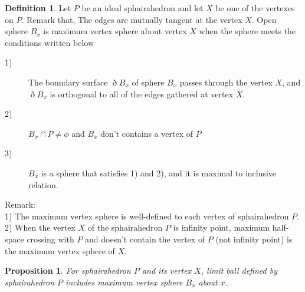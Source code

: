 \documentclass[suppldata, dvipdfmx]{interact}
\theoremstyle{plain}%
\newtheorem{proposition}[theorem]{Proposition}
\theoremstyle{definition}
\newtheorem{definition}[theorem]{Definition}
\theoremstyle{remark}
\theoremstyle{problemstyle}
\begin{document}
\begin{definition}
 Let $P$ be an ideal sphairahedron and let $X$ be one of the vertexes on $P$.
 Remark that, The edges are mutually tangent at the vertex $X$.
 Open sphere $B_x$ is maximum vertex sphere about vertex $X$ when the sphere
 meets the conditions written below

 \begin{description}
  \item[1)] The boundary surface $\eth B_x$ of sphere $B_x$ passes through
             the vertex $X$, and $\eth B_x$ is orthogonal to all of the
             edges gathered at vertex $X$.
  \item[2)] $B_x \cap P \neq \phi$ and $B_x$ don't contains a vertex of
             $P$
  \item[3)] $B_x$ is a sphere that satisfies 1) and 2), and it is
             maximal to inclusive relation.
 \end{description}
\end{definition}

Remark: \\
1) The maximum vertex sphere is well-defined to each vertex of sphairahedron
$P$.\\
2) When the vertex $X$ of the sphairahedron $P$ is infinity point,
 maximum half-space crossing with $P$ and doesn't contain the vertex of
 $P$ (not infinity point)
 is the maximum vertex sphere of $X$.

\begin{proposition}\label{prop:limitBall}
 For sphairahedron $P$ and its vertex $X$, limit ball defined by
 sphairahedron $P$ includes maximum vertex sphere $B_x$ about $x$.
\end{proposition}
\end{document}

